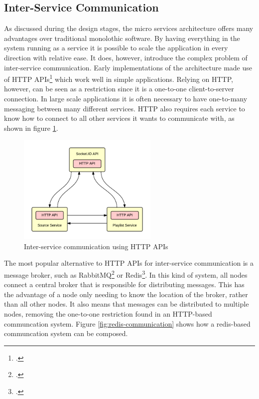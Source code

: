 \clearpage
\subsection{Inter-Service Communication}

As discussed during the design stages, the micro services architecture offers many advantages over traditional monolothic software. By having everything in the system running as a service it is possible to scale the application in every direction with relative ease. It does, however, introduce the complex problem of inter-service communication. Early implementations of the architecture made use of HTTP APIs\footcite{microservices-mueller} which work well in simple applications. Relying on HTTP, however, can be seen as a restriction since it is a one-to-one client-to-server connection. In large scale applications it is often necessary to have one-to-many messaging between many different services. HTTP also requires each service to know how to connect to all other services it wants to communicate with, as shown in figure \ref{fig:http-communication}.

\begin{figure}[h!]
  \centering
  \includegraphics[width=0.6\textwidth]{./img/http.png}
  \caption{Inter-service communication using HTTP APIs}
  \label{fig:http-communication}
\end{figure}

The most popular alternative to HTTP APIs for inter-service communication is a message broker, such as RabbitMQ\footcite{rabbitmq} or Redis\footcite{redis}. In this kind of system, all nodes connect a central broker that is responsible for distributing messages. This has the advantage of a node only needing to know the location of the broker, rather than all other nodes. It also means that messages can be distributed to multiple nodes, removing the one-to-one restriction found in an HTTP-based communcation system. Figure \ref{fig:redis-communication} shows how a redis-based communcation system can be composed.

